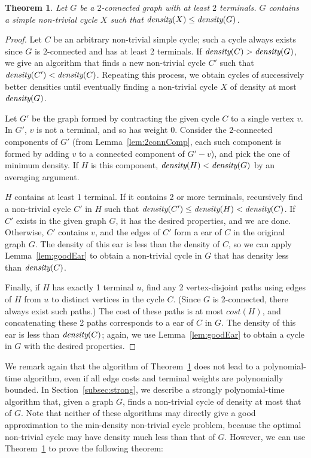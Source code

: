 \documentclass[11pt]{article}
\newtheorem{theorem}[lemma]{Theorem}
\newcommand{\dens}[1]{\emph{density}(#1)}
\begin{document}
\begin{theorem}\label{thm:cycleExists} 
  Let $G$ be a $2$-connected graph with at least $2$ terminals. $G$
  contains a simple non-trivial cycle $X$ such that $\dens{X} \le
  \dens{G}$.
\end{theorem}
\begin{proof}
  Let $C$ be an arbitrary non-trivial simple cycle; such a cycle
  always exists since $G$ is $2$-connected and has at least 2
  terminals.  If $\dens{C} > \dens{G}$, we give an algorithm that
  finds a new non-trivial cycle $C'$ such that $\dens{C'} < \dens{C}$.
  Repeating this process, we obtain cycles of successively better
  densities until eventually finding a non-trivial cycle $X$ of
  density at most $\dens{G}$.

  Let $G'$ be the graph formed by contracting the given cycle $C$ to a
  single vertex $v$. In $G'$, $v$ is not a terminal, and so has weight
  0. Consider the 2-connected components of $G'$ (from
  Lemma~\ref{lem:2connComp}, each such component is formed by adding
  $v$ to a connected component of $G' - v$), and pick the one of
  minimum density. If $H$ is this component, $\dens{H} < \dens{G}$ by
  an averaging argument.

  $H$ contains at least 1 terminal. If it contains 2 or more
  terminals, recursively find a non-trivial cycle $C'$ in $H$ such
  that $\dens{C'} \le \dens{H} < \dens{C}$. If $C'$ exists in the
  given graph $G$, it has the desired properties, and we are
  done. Otherwise, $C'$ contains $v$, and the edges of $C'$ form a ear
  of $C$ in the original graph $G$. The density of this ear is less
  than the density of $C$, so we can apply Lemma~\ref{lem:goodEar} to
  obtain a non-trivial cycle in $G$ that has density less than
  $\dens{C}$.

  Finally, if $H$ has exactly 1 terminal $u$, find any 2
  vertex-disjoint paths using edges of $H$ from $u$ to distinct
  vertices in the cycle $C$. (Since $G$ is 2-connected, there always
  exist such paths.) The cost of these paths is at most $cost(H)$, and
  concatenating these 2 paths corresponds to a ear of $C$ in $G$.  The
  density of this ear is less than $\dens{C}$; again, we use
  Lemma~\ref{lem:goodEar} to obtain a cycle in $G$ with the desired
  properties.
\end{proof}

We remark again that the algorithm of Theorem~\ref{thm:cycleExists} does
not lead to a polynomial-time algorithm, even if all edge costs and
terminal weights are polynomially bounded. In Section~\ref{subsec:strong},
we describe a strongly polynomial-time algorithm that, given a graph $G$,
finds a non-trivial cycle of density at most that of $G$.
Note that neither of these algorithms may directly give a good
approximation to the min-density non-trivial cycle problem, because
the optimal non-trivial cycle may have density much less than that of
$G$.  However, we can use Theorem~\ref{thm:cycleExists} to prove the
following theorem:
\end{document}
